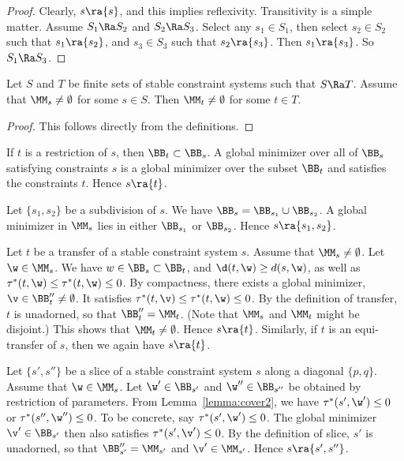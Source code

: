 \begin{proof}  Clearly, $s\ra \{s\}$, and this implies reflexivity.
Transitivity is a simple matter.  Assume
$S_1\Ra S_2$ and $S_2\Ra S_3$.  Select any $s_1\in S_1$, then select
$s_2\in S_2$ such that $s_1\ra \{s_2\}$, and $s_3\in S_3$ such
that $s_2\ra \{s_3\}$.  Then $s_1\ra\{s_3\}$.  So $S_1\Ra S_3$.
\end{proof}

\begin{lemma}\label{lemma:propagate}
Let $S$  and $T$ be finite sets of stable constraint systems such that
$S\Ra T$.  Assume that $\MM_s\ne\emptyset$ for some $s\in S$.
Then $\MM_t\ne\emptyset$ for some $t\in T$.
\end{lemma}

\begin{proof} This follows directly from the definitions. 
\end{proof}

\begin{example}[restriction]
If $t$ is a restriction of $s$, then $\BB_t\subset \BB_s$.
A global minimizer over all of $\BB_s$ satisfying constraints $s$ is
a global minimizer over the subset $\BB_t$ and satisfies the
constraints $t$.  Hence $s\ra\{t\}$.
\end{example}

\begin{example}[subdivision]
Let $\{s_1,s_2\}$ be a subdivision of $s$.  We have $\BB_s =
\BB_{s_1}\cup \BB_{s_2}$.  A global minimizer in $\MM_s$ lies in
either $\BB_{s_1}$ or $\BB_{s_2}$.  Hence $s\ra\{s_1,s_2\}$.
\end{example}

\begin{example}  Let $t$ be a transfer of
a stable constraint system $s$.  Assume that $\MM_s\ne\emptyset$.
Let $\w\in \MM_s$.
We have $w\in \BB_s\subset\BB_t$, and $\d(t,\w) \ge d(s,\w)$,
as well as $\tau^*(t,\w)\le\tau^*(t,\w)\le 0$.   By compactness, there
exists a global minimizer,
$\v\in\BB''_t\ne\emptyset$.  It satisfies
$\tau^*(t,\v)\le\tau^*(t,\w)\le 0$.  By the definition of transfer,
$t$
is unadorned, so that $\BB''_t=\MM_t$.  (Note that $\MM_s$ and
$\MM_t$
might be disjoint.)  This shows that
$\MM_t\ne\emptyset$.
Hence $s\ra\{t\}$.  Similarly, if $t$ is an equi-transfer of $s$,
then we again have $s\ra\{t\}$.
\end{example}

\begin{example}[slice]  Let $\{s',s''\}$ be a slice of
a stable constraint system $s$ along
a diagonal $\{p,q\}$.  Assume that $\w\in\MM_s$.
Let $\w'\in \BB_{s'}$ and $\w''\in \BB_{s''}$ be obtained
by restriction of parameters.  From Lemma~\ref{lemma:cover2},
we have $\tau^*(s',\w')\le 0$ or $\tau^*(s'',\w'')\le0$.  To be
concrete, say $\tau^*(s',\w')\le 0$.  The global minimizer
$\v'\in\BB_{s'}$
then also satisfies $\tau^*(s',\v')\le 0$.  By the definition of
slice, $s'$ is unadorned, so that $\BB''_{s'}=\MM_{s'}$ and
$\v'\in \MM_{s'}$.  Hence $s\ra\{s',s''\}$.
\end{example}

